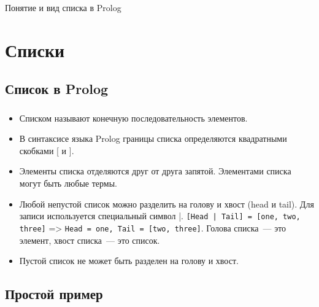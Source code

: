 


\begin{frame}[plain,c]

	\begin{center}
		\Huge Понятие и вид списка в Prolog
	\end{center}

\end{frame}

\section{Списки}

\subsection{Список в Prolog}

\begin{frame}
	\frametitle{\insertsection}
	\framesubtitle{\insertsubsection}
	
	\begin{itemize}
		\item Списком называют конечную последовательность элементов.
		\item В синтаксисе языка Prolog границы списка определяются квадратными скобками [ и ].
		\item Элементы списка отделяются друг от друга запятой. Элементами списка могут быть любые термы.
		\item Любой непустой список можно разделить на голову и хвост (head и tail). Для записи используется специальный символ |. 
		\texttt{[Head | Tail] = [one, two, three]} => \texttt{Head = one, Tail = [two, three]}. Голова списка~--- это элемент,
		хвост списка~--- это список.
		\item Пустой список не может быть разделен на голову и хвост.
	\end{itemize}

\end{frame}

\subsection{Простой пример}


